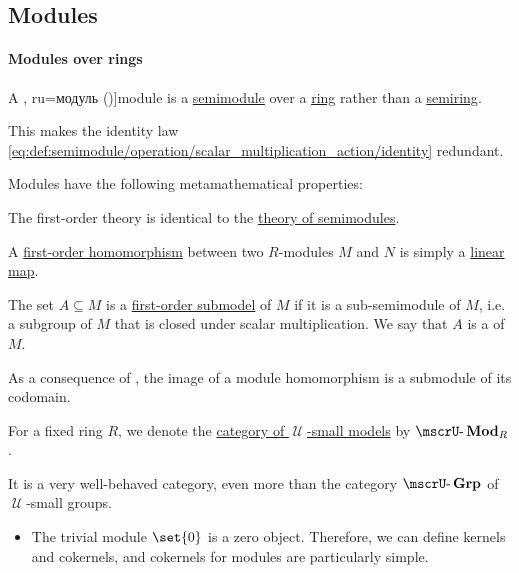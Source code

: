 \subsection{Modules}\label{subsec:modules}

\paragraph{Modules over rings}

\begin{definition}\label{def:module}
  A \term[bg=модул (\cite[27]{КоцевСидеров2016}, ru=модуль (\cite[11]{МальцевЖуравлёв2014})]{module} is a \hyperref[def:semimodule]{semimodule} over a \hyperref[def:ring]{ring} rather than a \hyperref[def:semiring]{semiring}.

  This makes the identity law \eqref{eq:def:semimodule/operation/scalar_multiplication_action/identity} redundant.

  Modules have the following metamathematical properties:
  \begin{thmenum}
     The first-order theory is identical to the \hyperref[def:semimodule/theory]{theory of semimodules}.

     A \hyperref[def:first_order_homomorphism]{first-order homomorphism} between two \( R \)-modules \( M \) and \( N \) is simply a \hyperref[def:semimodule/homomorphism]{linear map}.

     The set \( A \subseteq M \) is a \hyperref[def:first_order_submodel]{first-order submodel} of \( M \) if it is a sub-semimodule of \( M \), i.e. a subgroup of \( M \) that is closed under scalar multiplication. We say that \( A \) is a  of \( M \).

    As a consequence of , the image of a module homomorphism is a submodule of its codomain.

     For a fixed ring \( R \), we denote the \hyperref[def:category_of_small_first_order_models]{category of \( \mscrU \)-small models} by \( \ucat{Mod}_R \).

    It is a very well-behaved category, even more than the category \hyperref[def:group/category]{\( \ucat{Grp} \)} of \( \mscrU \)-small groups.
    \begin{itemize}
      \item The trivial module \( \set{ 0 } \) is a zero object. Therefore, we can define kernels and cokernels, and cokernels for modules are particularly simple.


\end{itemize}
\end{thmenum}
\end{definition}
